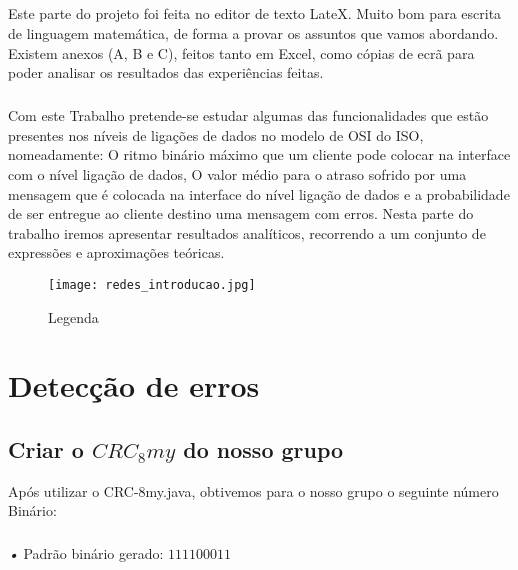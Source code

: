 \documentclass[13pt,a4paper]{report}
\begin{document}
\paragraph{}
Este parte do projeto foi feita no editor de texto LateX. Muito bom para escrita de linguagem matemática, de forma a provar os assuntos que vamos abordando. Existem anexos (A, B e C), feitos tanto em Excel, como cópias de ecrã para poder analisar os resultados das experiências feitas. 

\paragraph{}
Com este Trabalho pretende-se estudar algumas das funcionalidades que estão presentes nos níveis de ligações de dados no modelo de OSI do ISO, nomeadamente:
O ritmo binário máximo que um cliente pode colocar na interface com o nível ligação de dados, O valor médio para o atraso sofrido por uma mensagem que é colocada na interface do nível ligação de dados e a probabilidade de ser entregue ao cliente destino uma mensagem com erros.
Nesta parte do trabalho iremos apresentar resultados analíticos, recorrendo a um conjunto de expressões e aproximações teóricas.  

\begin{figure}[!htp]
\centering
\texttt{[image: redes\_introducao.jpg]}   
\caption{Legenda}
\end{figure}



\chapter{Detecção de erros}

\section{Criar o $CRC{_8my}$ do nosso grupo}

Após utilizar o CRC-8my.java, obtivemos para o nosso grupo o seguinte número Binário:
\paragraph{}

\emph{•} Padrão binário gerado: 
$111100011$
\paragraph{}
    
\end{document}
